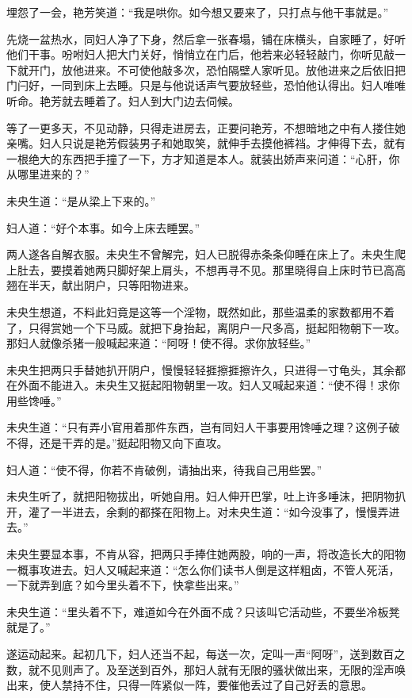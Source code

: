 \documentclass[a4paper,12pt,UTF8,twoside]{ctexbook}
\begin{document}
埋怨了一会，艳芳笑道：“我是哄你。如今想又要来了，只打点与他干事就是。”

先烧一盆热水，同妇人净了下身，然后拿一张春塌，铺在床横头，自家睡了，好听他们干事。吩咐妇人把大门关好，悄悄立在门后，他若来必轻轻敲门，你听见敲一下就开门，放他进来。不可使他敲多次，恐怕隔壁人家听见。放他进来之后依旧把门闩好，一同到床上去睡。只是与他说话声气要放轻些，恐怕他认得出。妇人唯唯听命。艳芳就去睡着了。妇人到大门边去伺候。

等了一更多天，不见动静，只得走进房去，正要问艳芳，不想暗地之中有人搂住她亲嘴。妇人只说是艳芳假装男子和她取笑，就伸手去摸他裤裆。才伸得下去，就有一根绝大的东西把手撞了一下，方才知道是本人。就装出娇声来问道：“心肝，你从哪里进来的？”

未央生道：“是从梁上下来的。”

妇人道：“好个本事。如今上床去睡罢。”

两人遂各自解衣服。未央生不曾解完，妇人已脱得赤条条仰睡在床上了。未央生爬上肚去，要摸着她两只脚好架上肩头，不想再寻不见。那里晓得自上床时节已高高翘在半天，献出阴户，只等阳物进来。

未央生想道，不料此妇竟是这等一个淫物，既然如此，那些温柔的家数都用不着了，只得赏她一个下马威。就把下身抬起，离阴户一尺多高，挺起阳物朝下一攻。那妇人就像杀猪一般喊起来道：“阿呀！使不得。求你放轻些。”

未央生把两只手替她扒开阴户，慢慢轻轻捱擦捱擦许久，只进得一寸龟头，其余都在外面不能进入。未央生又挺起阳物朝里一攻。妇人又喊起来道：“使不得！求你用些馋唾。”

未央生道：“只有弄小官用着那件东西，岂有同妇人干事要用馋唾之理？这例子破不得，还是干弄的是。”挺起阳物又向下直攻。

妇人道：“使不得，你若不肯破例，请抽出来，待我自己用些罢。”

未央生听了，就把阳物拔出，听她自用。妇人伸开巴掌，吐上许多唾沫，把阴物扒开，灌了一半进去，余剩的都搽在阳物上。对未央生道：“如今没事了，慢慢弄进去。”

未央生要显本事，不肯从容，把两只手捧住她两股，响的一声，将改造长大的阳物一概事攻进去。妇人又喊起来道：“怎么你们读书人倒是这样粗卤，不管人死活，一下就弄到底？如今里头着不下，快拿些出来。”

未央生道：“里头着不下，难道如今在外面不成？只该叫它活动些，不要坐冷板凳就是了。”

遂运动起来。起初几下，妇人还当不起，每送一次，定叫一声“阿呀”，送到数百之数，就不见则声了。及至送到百外，那妇人就有无限的骚状做出来，无限的淫声唤出来，使人禁持不住，只得一阵紧似一阵，要催他丢过了自己好丢的意思。
\end{document}
